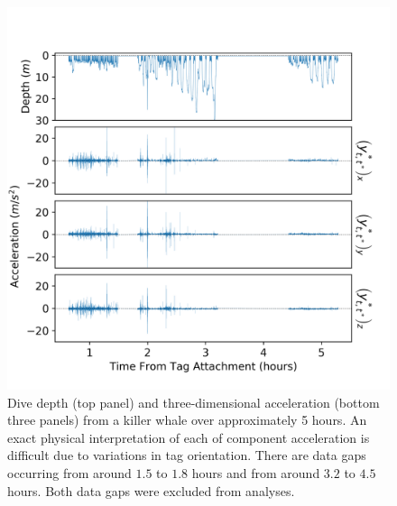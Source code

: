 
\begin{figure}[ht]
	\centering
	\includegraphics[width=5.25in]{../Plots/raw_data.png}
	\caption{Dive depth (top panel) and three-dimensional acceleration (bottom three panels) from a killer whale over approximately 5 hours. An exact physical interpretation of each of component acceleration is difficult due to variations in tag orientation. There are data gaps occurring from around $1.5$ to $1.8$ hours and from around $3.2$ to $4.5$ hours. Both data gaps were excluded from analyses.}
	\label{fig:data}
\end{figure}


